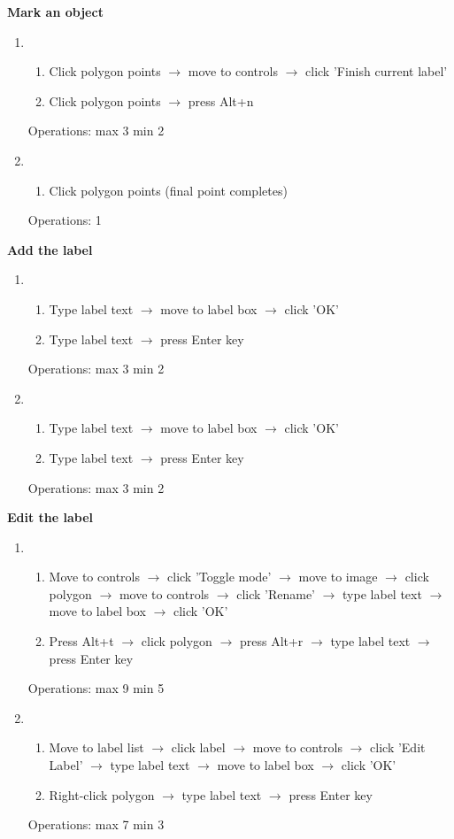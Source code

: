 \documentclass[a4paper,11pt,oneside]{article}
\begin{document}
{\bf Mark an object}
\begin{enumerate}
    \item
    \begin{enumerate}
        \item Click polygon points $\rightarrow$ move to controls $\rightarrow$ click 'Finish current label'
        \item Click polygon points $\rightarrow$ press Alt+n
    \end{enumerate}
    Operations: max 3 min 2
    \item
    \begin{enumerate}
        \item Click polygon points (final point completes)
    \end{enumerate}
    Operations: 1
\end{enumerate}

{\bf Add the label}
\begin{enumerate}
    \item
    \begin{enumerate}
        \item Type label text $\rightarrow$ move to label box $\rightarrow$ click 'OK'
        \item Type label text $\rightarrow$ press Enter key
    \end{enumerate}
    Operations: max 3 min 2
    \item
    \begin{enumerate}
        \item Type label text $\rightarrow$ move to label box $\rightarrow$ click 'OK'
        \item Type label text $\rightarrow$ press Enter key
    \end{enumerate}
    Operations: max 3 min 2
\end{enumerate}

{\bf Edit the label}
\begin{enumerate}
    \item
    \begin{enumerate}
        \item Move to controls $\rightarrow$ click 'Toggle mode' $\rightarrow$ move to image $\rightarrow$ click polygon $\rightarrow$ move to controls $\rightarrow$ click 'Rename' $\rightarrow$ type label text $\rightarrow$ move to label box $\rightarrow$ click 'OK'
        \item Press Alt+t $\rightarrow$ click polygon $\rightarrow$ press Alt+r $\rightarrow$ type label text $\rightarrow$ press Enter key
    \end{enumerate}
    Operations: max 9 min 5
    \item
    \begin{enumerate}
        \item Move to label list $\rightarrow$ click label $\rightarrow$ move to controls $\rightarrow$ click 'Edit Label' $\rightarrow$ type label text $\rightarrow$ move to label box $\rightarrow$ click 'OK'
        \item Right-click polygon $\rightarrow$ type label text $\rightarrow$ press Enter key
    \end{enumerate}
    Operations: max 7 min 3
\end{enumerate}
\end{document}
